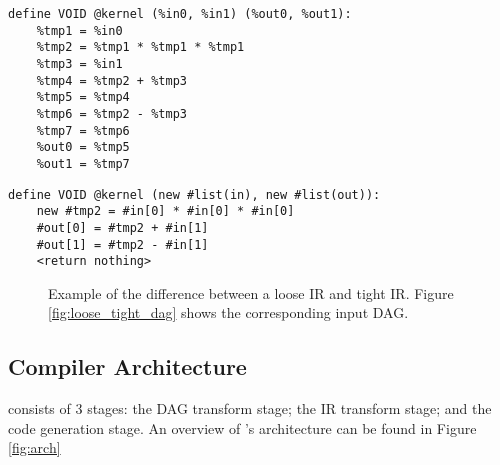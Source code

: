 \newsavebox{\looseIRlisting}
\begin{lrbox}{\looseIRlisting}%
\begin{lstlisting}
define VOID @kernel (%in0, %in1) (%out0, %out1):
	%tmp1 = %in0
	%tmp2 = %tmp1 * %tmp1 * %tmp1
	%tmp3 = %in1
	%tmp4 = %tmp2 + %tmp3
	%tmp5 = %tmp4
	%tmp6 = %tmp2 - %tmp3
	%tmp7 = %tmp6
	%out0 = %tmp5
	%out1 = %tmp7
\end{lstlisting}
\endminipage
\end{lrbox}

\newsavebox{\tightIRlisting}
\begin{lrbox}{\tightIRlisting}%
\begin{lstlisting}
define VOID @kernel (new #list(in), new #list(out)):
	new #tmp2 = #in[0] * #in[0] * #in[0]
	#out[0] = #tmp2 + #in[1]
	#out[1] = #tmp2 - #in[1]
	<return nothing>
\end{lstlisting}
\endminipage
\end{lrbox}

\begin{figure}
\centering


\usebox{\measurebox}\qquad
    \begin{minipage}[][\ht\measurebox][c]{.26\textwidth}
       
    \end{minipage}
\caption{Example of the difference between a loose IR and tight IR. Figure \ref{fig:loose_tight_dag} shows the corresponding input DAG.}
\label{fig:tight_loose}
\end{figure}


\subsection{Compiler Architecture}
\phlat consists of 3 stages: the DAG transform stage; the IR transform stage; and the code generation stage.
An overview of \phlat{}'s architecture can be found in Figure \ref{fig:arch}



